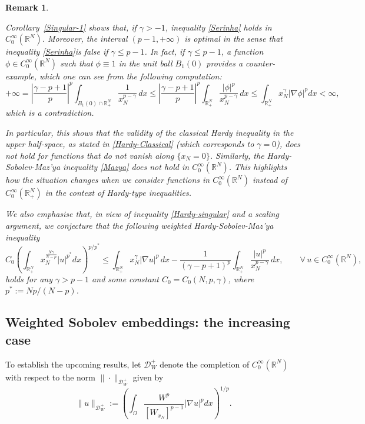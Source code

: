 \documentclass[12pt]{amsart}
\newtheorem{remark}[theorem]{Remark}
\theoremstyle{definition}
\theoremstyle{plain}
\newcommand{\dint}{\int_{\Omega}}
\begin{document}
\begin{remark}\label{Remak-Singular}

Corollary~\ref{Singular-1} shows that, if \( \gamma >-1\),  
inequality \eqref{Serinha} holds in  $C_0^\infty(\mathbb{R}^N)$. Moreover, the 
interval $(p-1,+\infty)$  is optimal in the sense that inequality \eqref{Serinha}is 
false if  $\gamma\leq p-1$. In fact, 
if $\gamma\leq p-1$, a function 
$\phi \in C_0^\infty(\mathbb{R}^N)$ such that $\phi \equiv1$ in the 
unit ball $B_1(0)$ provides a counter-example, which one can 
see from the following computation: 
$$
+\infty=\left|\frac{\gamma-p+1}{p}\right|^p\int_{B_1(0) \cap \mathbb{R}^N_+} 
\frac{1}{x_N^{p-\gamma}}\,dx\leq \left|\frac{\gamma-p+1}{p}\right|^p \int_{\mathbb{R}^N_+} 
\frac{|\phi|^p}{x_N^{p-\gamma}}\,dx \leq \int_{\mathbb{R}^N_+} x_N^{\gamma}
|\nabla \phi|^pdx<\infty,
$$
which is a contradiction.

In particular, this shows that the validity of the classical 
Hardy inequality in the upper half-space, as stated in \eqref{Hardy-Classical} 
(which corresponds to $\gamma=0$), does not hold for functions that 
do not vanish along $\{ x_N = 0\}$. Similarly, the 
Hardy-Sobolev-Maz'ya inequality \eqref{Mazya}  does not hold in $C_0^\infty
(\mathbb{R}^N)$. This highlights how the situation changes when we consider functions 
in \( C_0^\infty(\mathbb{R}^N) \) instead of \( C_0^\infty(\mathbb{R}^N_{+}) \) in 
the context of Hardy-type inequalities.

We also emphasise that, in view of  inequality \eqref{Hardy-singular} and a scaling 
argument, we conjecture that the following weighted Hardy-Sobolev-Maz'ya inequality
$$
C_0\left(\int_{\mathbb{R}^N_+} x_N^\frac{N\gamma}{N-p}|u|^{p^*}dx
\right)^{p/p^*}\leq\int_{\mathbb{R}^N_+} x_N^{\gamma}|\nabla u|^p \, dx
-\frac{1}{(\gamma -p+1)^{p}} \int_{\mathbb{R}^N_+} \frac{|u|^p}{x_N^{p-\gamma}}\,dx
,\qquad \forall\, u\in C_0^\infty(\mathbb{R}^N),
$$
holds for any $\gamma>p-1$ and some constant $C_0=C_0(N,p,\gamma)$, where $p^*:=Np/(N-p)$.
\end{remark}

\subsection{Weighted Sobolev embeddings: the increasing case}

To establish the upcoming results, let $\mathcal{D}_W^+$ denote the completion of $C_0^\infty(\mathbb{R}^N)$ with respect to the norm $\|\cdot\|_{\mathcal{D}_W^+}$ given by 
$$
    \|u\|_{\mathcal{D}_W^+}:=\left(\dint \frac{W^p}{[W_{x_N}]^{p-1}} 
    |\nabla u|^pdx\right)^{1/p}.
$$
\end{document}
